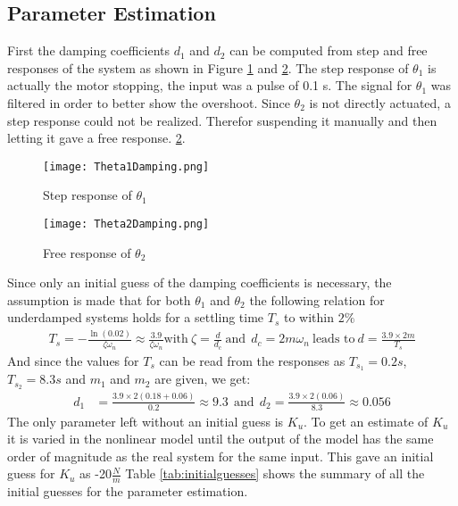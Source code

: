 \documentclass[main.tex]{subfiles}
\begin{document}
\subsection{Parameter Estimation}
First the damping coefficients $d_1$ and $d_2$ can be computed from step and free responses of the system as shown in Figure \ref{fig:impulse1} and \ref{fig:impulse2}. The step response of $\theta_1$ is actually the motor stopping, the input was a pulse of 0.1 s. The signal for $\theta_1$ was filtered in order to better show the overshoot. Since $\theta_2$ is not directly actuated, a step response could not be realized. Therefor suspending it manually and then letting it gave a free response. \ref{fig:impulse2}.  
\begin{figure}[ht]
\centering
\texttt{[image: Theta1Damping.png]}
\caption{\label{fig:impulse1} Step response of $\theta_1$}
\end{figure}
\begin{figure}[ht]
\centering
\texttt{[image: Theta2Damping.png]}
\caption{\label{fig:impulse2} Free response of $\theta_2$}
\end{figure}
Since only an initial guess of the damping coefficients is necessary, the assumption is made that for both $\theta_1$ and $\theta_2$ the following relation for underdamped systems holds for a settling time $T_s$ to within $2\%$
\begin{align*}
 T_s =  -\frac{\ln(0.02)}{\zeta \omega_n}\approx\frac{3.9}{\zeta \omega_n} \text{with} \  \zeta = \frac{d}{d_c} \ \text{and}  \ \ d_c=2m\omega_n \ \text{leads to} \ d = \frac{3.9\times 2 m}{T_s}
\end{align*}
And since the values for $T_s$ can be read from the responses as $T_{s_1}=0.2s$, $T_{s_2}=8.3s$ and $m_1$ and $m_2$ are given, we get: 
\begin{align*}
d_1 &= \frac{3.9\times 2(0.18+0.06)}{0.2}\approx 9.3 \ \  \text{and} \  \ 
d_2 = \frac{3.9\times 2(0.06)}{8.3}\approx 0.056
\end{align*}
The only parameter left without an initial guess is $K_u$. To get an estimate of $K_u$ it is varied in the nonlinear model until the output of the model has the same order of magnitude as the real system for the same input. This gave an initial guess for $K_u$ as -20$\frac{N}{m}$
Table \ref{tab:initialguesses} shows the summary of all the initial guesses for the parameter estimation.
\end{document}
